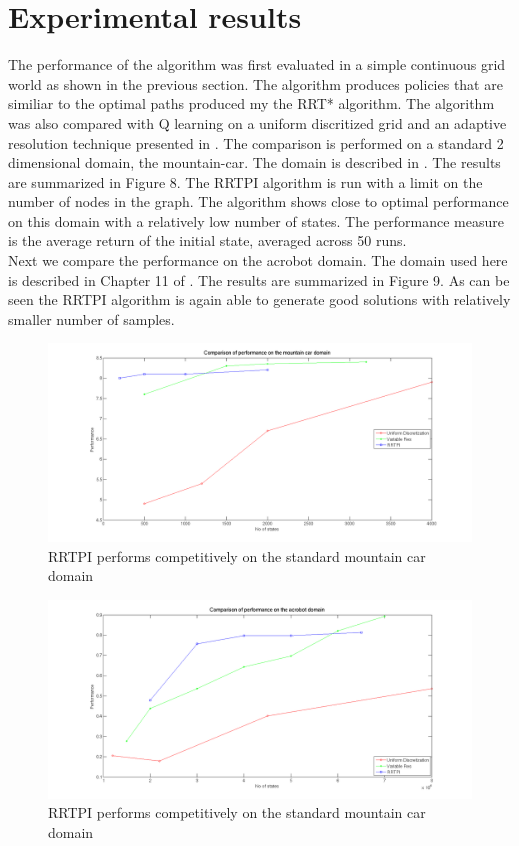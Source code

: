 \documentclass[wcp]{jmlr}
\begin{document}
\section{Experimental results}
The performance of the algorithm was first evaluated in a simple continuous grid world as shown in the previous section. The algorithm produces policies that are similiar to the optimal paths produced my the RRT* algorithm. The algorithm was also compared with Q learning on a uniform discritized grid and an adaptive resolution technique presented in \citep{munosvariablehigh}. The comparison is performed on a standard 2 dimensional domain, the mountain-car. The domain is described in \citep{mcar}. The results are summarized in Figure 8. The RRTPI algorithm is run with a limit on the number of nodes in the graph. The algorithm shows close to optimal performance on this domain with a relatively low number of states. The performance measure is the average return of the initial state, averaged across 50 runs.\\
Next we compare the performance on the acrobot domain. The domain used here is described in Chapter 11 of \cite{rlbook}. The results are summarized in Figure 9. As can be seen the RRTPI algorithm is again able to generate good solutions with relatively smaller number of samples.

\begin{figure}[htb]
\centering
\label{fig:res1}
\includegraphics[scale=0.33]{res1.png}
\caption{RRTPI performs competitively on the standard mountain car domain}
\end{figure}

\begin{figure}[htb]
\centering
\label{fig:res2}
\includegraphics[scale=0.33]{res2.png}
\caption{RRTPI performs competitively on the standard mountain car domain}
\end{figure}
\end{document}
